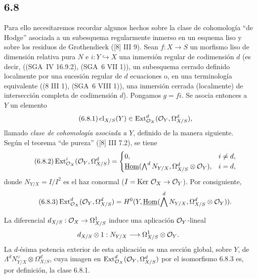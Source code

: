 \subsection*{6.8}
Para ello necesitaremos recordar algunos hechos sobre la clase de cohomología ``de Hodge'' asociada a un subesquema regularmente inmerso en un esquema liso y sobre los residuos de Grothendieck ([8] III 9). Sean $f:X\to S$ un morfismo liso de dimensión relativa pura $N$ e $i:Y\hookrightarrow X$ una inmersión regular de codimensión $d$ (es decir, ((SGA~IV 16.9.2), (SGA~6 VII 1)), un subesquema cerrado definido localmente por una sucesión regular de $d$ ecuaciones o, en una terminología equivalente ((8 III 1), (SGA~6 VIII 1)), una inmersión cerrada (localmente) de intersección completa de codimensión $d$). Pongamos $g=fi$. Se asocia entonces a $Y$ un elemento
\begin{equation}
\tag{6.8.1}
\operatorname{cl}_{X/S}(Y)\in\operatorname{Ext}^d_{\mathcal{O}_X}(\mathcal{O}_Y,\Omega^d_{X/S}),
\end{equation}
llamado \emph{clase de cohomología asociada a $Y$}, definido de la manera siguiente. Según el teorema ``de pureza'' ([8] III 7.2), se tiene
\begin{equation}
\tag{6.8.2}
\operatorname{Ext}^i_{\mathcal{O}_X}(\mathcal{O}_Y,\Omega^d_{X/S})=
\begin{cases}
0,& i\ne d,\\
\underline{\operatorname{Hom}}(\bigwedge^d N_{Y/X},\Omega^d_{X/S}\otimes\mathcal{O}_Y),& i=d,
\end{cases}
\end{equation}
donde $N_{Y/X}=I/I^2$ es el haz conormal ($I=\operatorname{Ker}\,\mathcal{O}_X\to\mathcal{O}_Y$). Por consiguiente,
\begin{equation}
\tag{6.8.3}
\operatorname{Ext}^d_{\mathcal{O}_X}(\mathcal{O}_Y,\Omega^d_{X/S})=H^0(Y,\underline{\operatorname{Hom}}(\bigwedge^dN_{Y/X},\Omega^d_{X/S}\otimes\mathcal{O}_Y)).
\end{equation}

La diferencial $d_{X/S}:\mathcal{O}_X\to\Omega^1_{X/S}$ induce una aplicación $\mathcal{O}_Y$-lineal
\[
d_{X/S}\otimes 1:N_{Y/X}\longrightarrow \Omega^1_{X/S}\otimes\mathcal{O}_Y.
\]
La $d$-ésima potencia exterior de esta aplicación es una sección global, sobre $Y$, de $\Lambda^d N_{Y/X}^{\vee}\otimes\Omega^d_{X/S}$, cuya imagen en $\operatorname{Ext}^d_{\mathcal{O}_X}(\mathcal{O}_Y,\Omega^d_{X/S})$ por el isomorfismo 6.8.3 es, por definición, la clase 6.8.1.


